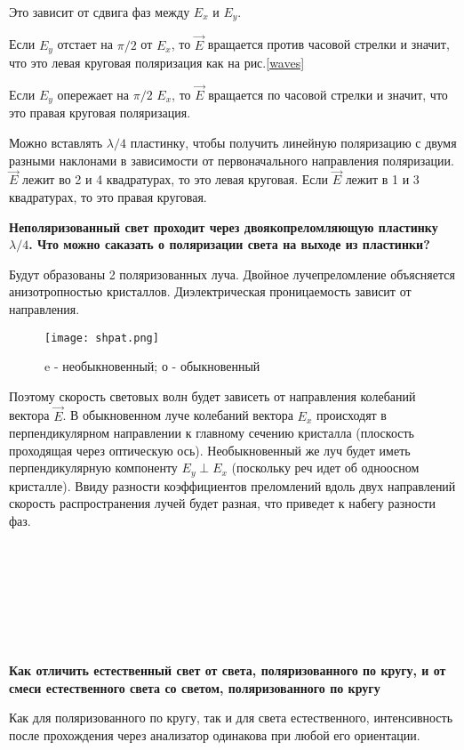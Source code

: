 \documentclass[12pt,a4paper]{article}
\begin{document}
Это зависит от сдвига фаз между $E_x$ и  $E_y$. 

Если $E_y$ отстает на $\pi/2$ от $E_x$, то $\vec{E}$ вращается против часовой стрелки и значит, что это левая круговая поляризация как на рис.\ref{waves} 

Если $E_y$ опережает на $\pi/2$  $E_x$, то $\vec{E}$ вращается по часовой стрелки и значит, что это правая круговая поляризация. 

Можно вставлять $\lambda/4$ пластинку, чтобы получить линейную поляризацию с двумя разными наклонами в зависимости от первоначального направления поляризации. $\vec{E}$ лежит во 2 и 4 квадратурах, то это левая круговая. Если $\vec{E}$ лежит в 1 и 3 квадратурах, то это правая круговая. 


 

\textbf{Неполяризованный свет проходит через двоякопреломляющую пластинку $\lambda/4$. Что можно саказать о поляризации света на выходе из пластинки?}



Будут образованы 2 поляризованных луча. Двойное лучепреломление объясняется анизотропностью кристаллов. Диэлектрическая проницаемость зависит от направления. 


\begin{wrapfigure}[14]{r}{130pt}
\texttt{[image: shpat.png]}
\caption{e - необыкновенный; о - обыкновенный}
\label{shpat}
\end{wrapfigure}

Поэтому скорость световых волн будет зависеть от направления колебаний вектора $\vec{E}$. В обыкновенном луче колебаний вектора $E_x$ происходят в перпендикулярном направлении к главному сечению кристалла (плоскость проходящая через оптическую ось). Необыкновенный же луч будет иметь перпендикулярную компоненту $E_y \perp E_x$ (поскольку реч идет об одноосном кристалле). Ввиду разности коэффициентов преломлений вдоль двух направлений скорость распространения лучей будет разная, что приведет к набегу разности фаз. 



\

\

\

\

\textbf{Как отличить естественный свет от света, поляризованного по кругу, и от смеси естественного света со светом, поляризованного по кругу}

Как для поляризованного по кругу, так и для света естественного, интенсивность после прохождения через анализатор одинакова при любой его ориентации.
\end{document}
